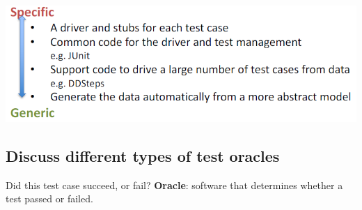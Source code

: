 \documentclass{article}
\begin{document}
\begin{center}
    \includegraphics[scale=0.45]{image/49.PNG}
\end{center}



\subsection{Discuss different types of test oracles}
\noindent Did
this
test
case
succeed,
or
fail?
\textbf{Oracle}:
software
that
determines
whether
a
test
passed
or
failed.
\end{document}
